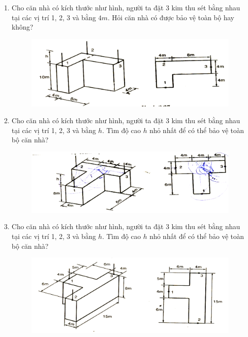 \documentclass[12pt,a4paper]{article}
\begin{document}
\begin{enumerate}
        \item Cho căn nhà có kích thước như hình, người ta đặt 3 kim thu sét bằng nhau tại các vị trí 1, 2, 3 và bằng $4m$. Hỏi căn nhà có được bảo vệ toàn bộ hay không?
            \begin{figure}[htp]
                \begin{center}
                    \includegraphics[scale=.35]{baitap3}
                \end{center}
            \end{figure} 
        
        \item Cho căn nhà có kích thước như hình, người ta đặt 3 kim thu sét bằng nhau tại các vị trí 1, 2, 3 và bằng $h$. Tìm độ cao $h$ nhỏ nhất để có thể bảo vệ toàn bộ căn nhà?
            \begin{figure}[htp]
                \begin{center}
                    \includegraphics[scale=.35]{baitap4}
                \end{center}
            \end{figure}
            
        \item Cho căn nhà có kích thước như hình, người ta đặt 3 kim thu sét bằng nhau tại các vị trí 1, 2, 3 và bằng $h$. Tìm độ cao $h$ nhỏ nhất để có thể bảo vệ toàn bộ căn nhà?
            \begin{figure}[htp]
                \begin{center}
                    \includegraphics[scale=.35]{baitap5}
                \end{center}
            \end{figure}
            

\end{enumerate}
\end{document}
